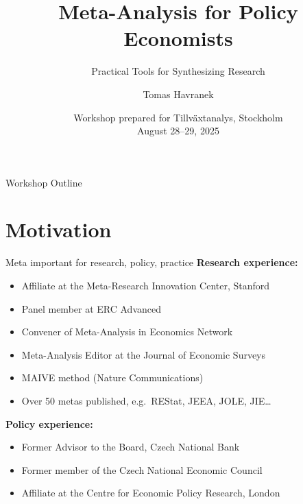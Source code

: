 \documentclass{beamer} %
\title[Meta Workshop for Tillv\"{a}xtanalys] %
{Meta-Analysis for Policy Economists}
\subtitle{Practical Tools for Synthesizing Research}
\author[T.\ Havranek] %
{ Tomas Havranek
}
\institute[Prague] %
{
  	Charles University, Prague\\ Centre for Economic Policy Research, London \\ Meta-Research Innovation Center, Stanford

  
}%
\date[August 28--29, 2025] %
{Workshop prepared for Tillv\"{a}xtanalys, Stockholm\\[2ex]
  August 28--29, 2025
}%
\begin{document}
\begin{frame}
  \titlepage
\end{frame}


\begin{frame}{Workshop Outline}
  \tableofcontents
\end{frame}


\section{Motivation}



\begin{frame}{Meta important for research, policy, practice}
\textbf{Research experience:}
\begin{itemize}
	\item Affiliate at the Meta-Research Innovation Center, Stanford
	\item Panel member at ERC Advanced
		\item Convener of Meta-Analysis in Economics Network
		\item Meta-Analysis Editor at the Journal of Economic Surveys
		\item MAIVE method (Nature Communications)
				\item Over 50 metas published, e.g.\ REStat, JEEA, JOLE, JIE\ldots
\end{itemize}

\bigskip

\textbf{Policy experience:}

\begin{itemize}
	\item Former Advisor to the Board, Czech National Bank
	\item Former member of the Czech National Economic Council
	\item Affiliate at the Centre for Economic Policy Research, London
\end{itemize}


\end{frame}
\end{document}
